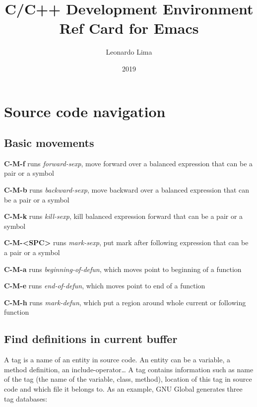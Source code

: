 \documentclass[10pt]{article}
\title{C/C++ Development Environment Ref Card for Emacs}
\author{Leonardo Lima}
\date{2019}
\renewcommand{\maketitle}{%
{\begin{center}\Large \mythetitle\end{center}}
}
\begin{document}
\begin{multicols}{3}
\maketitle

\section{Source code navigation}

\subsection{Basic movements}

\begin{ttdesc}[labelwidth=\widthof{\texttt{report}}]

\item[\textbf{C-M-f}] runs \emph{forward-sexp}, move forward over a balanced expression that can be a pair or a symbol
\item[\textbf{C-M-b}] runs \emph{backward-sexp}, move backward over a balanced expression that can be a pair or a symbol
\item[\textbf{C-M-k}] runs \emph{kill-sexp}, kill balanced expression forward that can be a pair or a symbol
\item[\textbf{C-M-<SPC>}] runs \emph{mark-sexp}, put mark after following expression that can be a pair or a symbol
\item[\textbf{C-M-a}] runs \emph{beginning-of-defun}, which moves point to beginning of a function
\item[\textbf{C-M-e}] runs \emph{end-of-defun}, which moves point to end of a function
\item[\textbf{C-M-h}] runs \emph{mark-defun}, which put a region around whole current or following function

\end{ttdesc}

\subsection{Find definitions in current buffer}

A tag is a name of an entity in source code. An entity can be a variable, a method definition, an include-operator… A tag contains information such as name of the tag (the name of the variable, class, method), location of this tag in source code and which file it belongs to. As an example, GNU Global generates three tag databases:


\end{multicols}
\end{document}
